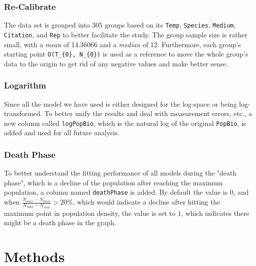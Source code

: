 \documentclass[11pt]{article}
\begin{document}
\subsubsection{Re-Calibrate}
The data set is grouped into 305 groups based on its \verb|Temp|, \verb|Species|, \verb|Medium|, \verb|Citation|, and \verb|Rep| to better facilitate the study. The group sample size is rather small, with a \emph{mean} of 14.36066 and a \emph{median} of 12. Furthermore, each group's starting point \verb|O(T_{0}, N_{0})| is used as a reference to move the whole group's data to the origin to get rid of any negative values and make better sense.
\subsubsection{Logarithm}
Since all the model we have used is either designed for the log-space or being log-transformed. To better unify the results and deal with measurement errors, etc., a new column called \verb|logPopBio|, which is the natural log of the original \verb|PopBio|, is added and used for all future analysis.
\subsubsection{Death Phase}
To better understand the fitting performance of all models during the "death phase", which is a decline of the population after reaching the maximum population, a column named \verb|deathPhase| is added. By default the value is $0$, and when $\frac{N_{max} - N_{tlast}}{N_{max}-N_{min}} > 20\%$, which would indicate a decline after hitting the maximum point in population density, the value is set to $1$, which indicates there might be a death phase in the graph.

\section{Methods}
\end{document}
